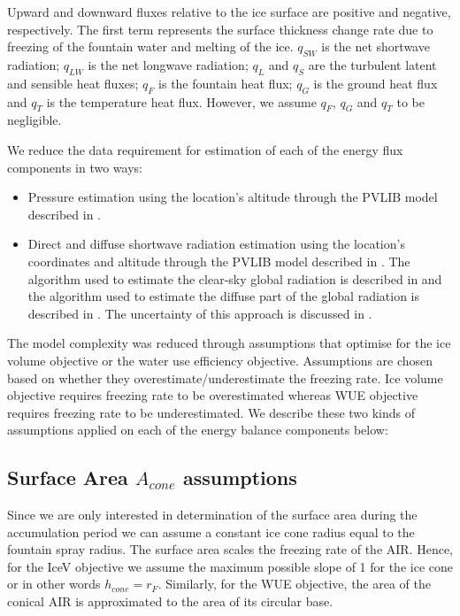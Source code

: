 \documentclass[tc, manuscript]{copernicus}
\begin{document}
Upward and downward fluxes relative to the ice surface are positive and negative, respectively. The first term
represents the surface thickness change rate due to freezing of the fountain water and melting of the ice.
$q_{SW}$ is the net shortwave radiation; $q_{LW}$ is the net longwave radiation; $q_{L}$ and $q_{S}$ are the
turbulent latent and sensible heat fluxes; $q_{F}$ is the fountain heat flux; $q_{G}$ is the ground heat flux
and $q_{T}$ is the temperature heat flux. However, we assume $q_{F}$, $q_{G}$ and $q_{T}$ to be negligible.

We reduce the data requirement for estimation of each of the energy flux components in two ways:

\begin{itemize}
  \item Pressure estimation using the location's altitude through the PVLIB model described in
    \citet{holmgrenPvlibPythonPython2018}.
  \item Direct and diffuse shortwave radiation estimation using the location's coordinates and altitude through the
    PVLIB model described in \citet{holmgrenPvlibPythonPython2018}. The algorithm used to estimate the
    clear-sky global radiation is described in \citet{ineichenBroadbandSimplifiedVersion2008} and the algorithm
    used to estimate the diffuse part of the global radiation is described in
\citet{erbsEstimationDiffuseRadiation1982}. The uncertainty of this approach is discussed in
\cite{ineichenValidationModelsThat2016}. 
\end{itemize}

The model complexity was reduced through assumptions that optimise for the ice volume objective or the water use
efficiency objective. Assumptions are chosen based on whether they overestimate/underestimate the freezing rate.
Ice volume objective requires freezing rate to be overestimated whereas WUE objective requires freezing rate to
be underestimated. We describe these two kinds of assumptions applied on each of the energy balance components
below: 

\subsection{Surface Area $A_{cone}$ assumptions}

Since we are only interested in determination of the surface area during the accumulation period we can assume a
constant ice cone radius equal to the fountain spray radius. The surface area scales the freezing rate of the
AIR. Hence, for the IceV objective we assume the maximum possible slope of 1 for the ice cone or in other words
$h_{cone} = r_{F}$. Similarly, for the WUE objective, the area of the conical AIR is
approximated to the area of its circular base. 
\end{document}
